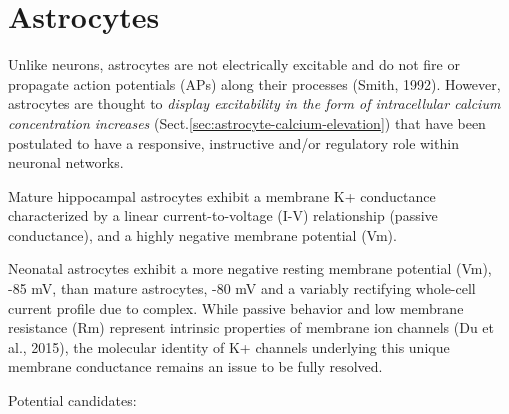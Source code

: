 \chapter{Astrocytes}
\label{sec:astrocyte-modeling}


Unlike neurons, astrocytes are not electrically excitable and do not fire or
propagate action potentials (APs) along their processes (Smith, 1992). However,
astrocytes are thought to {\it display excitability in the form of intracellular
calcium concentration increases} (Sect.\ref{sec:astrocyte-calcium-elevation})
that have been postulated to have a responsive, instructive and/or regulatory
role within neuronal networks.

Mature hippocampal astrocytes exhibit a membrane K+ conductance characterized by
a linear current-to-voltage (I-V) relationship (passive conductance), and a
highly negative membrane potential (Vm).


Neonatal astrocytes exhibit a more negative resting membrane potential (Vm), -85
mV, than mature astrocytes, -80 mV and a variably rectifying whole-cell current
profile due to complex. While passive behavior and low membrane resistance (Rm)
represent intrinsic properties of membrane ion channels (Du et al., 2015), the
molecular identity of K+ channels underlying this unique membrane conductance
remains an issue to be fully resolved.

Potential candidates:

